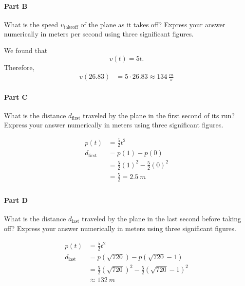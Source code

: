 \paragraph{Part B}
What is the speed $v_{\mathrm{takeoff}}$ of the plane as it takes off? Express your answer numerically in meters per second using three significant figures.

\begin{solution}
	We found that
	\[
		v(t) = 5t
		.\]
	Therefore,
	\begin{align*}
		v(26.83) &= 5 \cdot 26.83 \approx \boxed{\SI{134}{\frac{m}{s}}}
	\end{align*}
\end{solution}

\paragraph{Part C}
What is the distance $d_{\mathrm{first}}$ traveled by the plane in the first second of its run? Express your answer numerically in meters using three significant figures.

\begin{solution}
	\begin{align*}
		p(t) &= \frac{5}{2}t^2 \\
		d_{\mathrm{first}} &= p(1) - p(0) \\
		&= \frac{5}{2}\left( 1 \right)^2 - \frac{5}{2}\left( 0 \right)^2 \\
		&= \frac{5}{2} = \boxed{\SI{2.5}{m}} \\
	\end{align*}
\end{solution}

\paragraph{Part D}
What is the distance $d_{\mathrm{last}}$ traveled by the plane in the last second before taking off? Express your answer numerically in meters  using three significant figures.

\begin{solution}
	\begin{align*}
		p(t) &= \frac{5}{2}t^2 \\
		d_{\mathrm{last}} &= p(\sqrt{720}) - p(\sqrt{720}-1) \\
		&= \frac{5}{2} \left( \sqrt{720} \right)^2 - \frac{5}{2} \left( \sqrt{720} -1 \right)^2 \\
		&\approx \boxed{\SI{132}{m}}
	\end{align*}
\end{solution}

